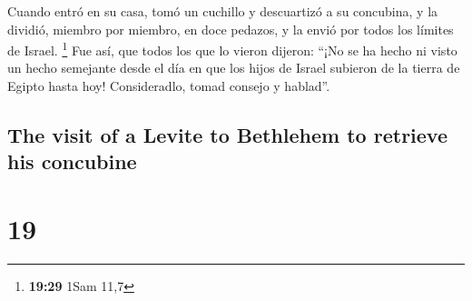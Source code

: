 \begin{paracol}{2}
 Cuando entró en su casa, tomó un cuchillo y descuartizó
a su concubina, y la dividió, miembro por miembro, en doce pedazos, y la
envió por todos los límites de Israel. \footnote{\textbf{19:29} 1Sam
  11,7}  Fue así, que todos los que lo vieron dijeron:
``¡No se ha hecho ni visto un hecho semejante desde el día en que los
hijos de Israel subieron de la tierra de Egipto hasta hoy! Consideradlo,
tomad consejo y hablad''.

\switchcolumn
\begin{otherlanguage}{english}

\hypertarget{the-visit-of-a-levite-to-bethlehem-to-retrieve-his-concubine}{%
\subsection{The visit of a Levite to Bethlehem to retrieve his
concubine}\label{the-visit-of-a-levite-to-bethlehem-to-retrieve-his-concubine}}

\hypertarget{section-37}{%
\section{19}\label{section-37}}


\end{otherlanguage}
\end{paracol}
